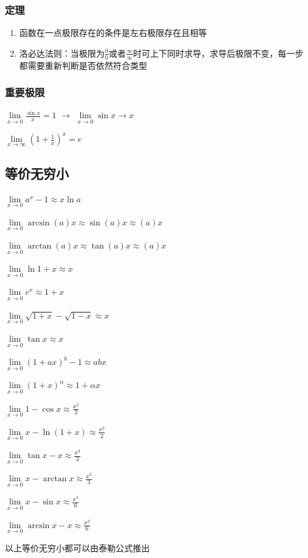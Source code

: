 \documentclass[UTF8]{ctexbook}
\newcommand{\limNormal}[1]{$\lim\limits_{#1}$}
\newcommand{\myLimToZero}{\limNormal{x \to 0}}
\newcommand{\myLimToInf}{\limNormal{x \to \infty}}
\begin{document}
{{{{    \subsubsection{定理}{
      \begin{enumerate}
        \item 函数在一点极限存在的条件是左右极限存在且相等
        \item 洛必达法则：当极限为$\frac{0}{0}$或者$\frac{\infty}{\infty}$时可上下同时求导，求导后极限不变，每一步都需要重新判断是否依然符合类型
      \end{enumerate}
    }

    \subsubsection{重要极限}{
      \myLimToZero$\frac{\sin{x}}{x}=1$ $\to$ \limNormal{x \to 0}$\sin{x} \to x$

      \myLimToInf$(1+\frac{1}{x})^x = e$
    }
  }

  \subsection{等价无穷小}{
    \myLimToZero$a^x - 1 \approx x\ln{a}$

    \myLimToZero$\arcsin(a)x \approx \sin(a)x \approx (a)x$

    \myLimToZero$\arctan(a)x \approx \tan(a)x \approx (a)x$

    \myLimToZero$\ln1+x \approx x$

    \myLimToZero$e^x \approx 1+x$

    \myLimToZero$\sqrt{1 + x} - \sqrt{1 - x} \approx x$

    \myLimToZero$\tan{x} \approx x$

    \myLimToZero$(1 + ax)^b - 1 \approx abx$

    \myLimToZero$(1+x)^\alpha \approx 1+\alpha x$

    \myLimToZero$1 - \cos x \approx \frac{x^2}{2}$

    \myLimToZero$x - \ln(1 + x) \approx \frac{x^2}{2}$

    \myLimToZero$\tan x - x \approx \frac{x^3}{3}$

    \myLimToZero$x - \arctan x \approx \frac{x^3}{3}$

    \myLimToZero$x - \sin x \approx \frac{x^3}{6}$

    \myLimToZero$\arcsin x - x \approx \frac{x^3}{6}$

    以上等价无穷小都可以由泰勒公式推出
  }

}}}
\end{document}
